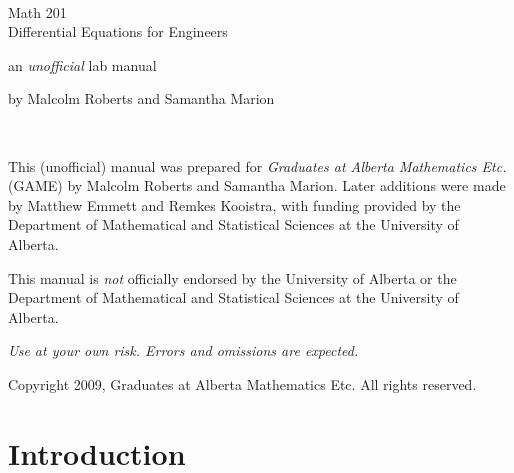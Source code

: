 \documentclass[10pt,driverfallback=hypertex]{report}
\begin{document}
\sloppy




\pagestyle{empty}

\begin{center}
  \ \vspace{1in}

  \textsf{\LARGE Math 201} \\
  \vspace{0.2in}
  \textsf{\LARGE Differential Equations for Engineers}
  \vspace{2in}

  \textsf{\Huge an \emph{unofficial} lab manual}
  \vspace{2.5in}

by Malcolm Roberts and Samantha Marion
\vspace{0.5in}

\end{center}

\newpage

\ \vspace{5in}

\noindent
This (unofficial) manual was prepared for \emph{Graduates at Alberta
  Mathematics Etc.} (GAME) by Malcolm Roberts and Samantha Marion.
Later additions were made by Matthew Emmett and Remkes Kooistra, with
funding provided by the Department of Mathematical and Statistical
Sciences at the University of Alberta.
\vspace{0.5in}

\noindent
This manual is \emph{not} officially endorsed by the University of
Alberta or the Department of Mathematical and Statistical Sciences at
the University of Alberta.
\vspace{0.5in}

\noindent
\emph{Use at your own risk.  Errors and omissions are expected.}
\vspace{0.5in}

\noindent
Copyright 2009, Graduates at Alberta Mathematics Etc.  All rights
reserved.


\newpage
\pagestyle{plain}

\section*{Introduction}
\end{document}
